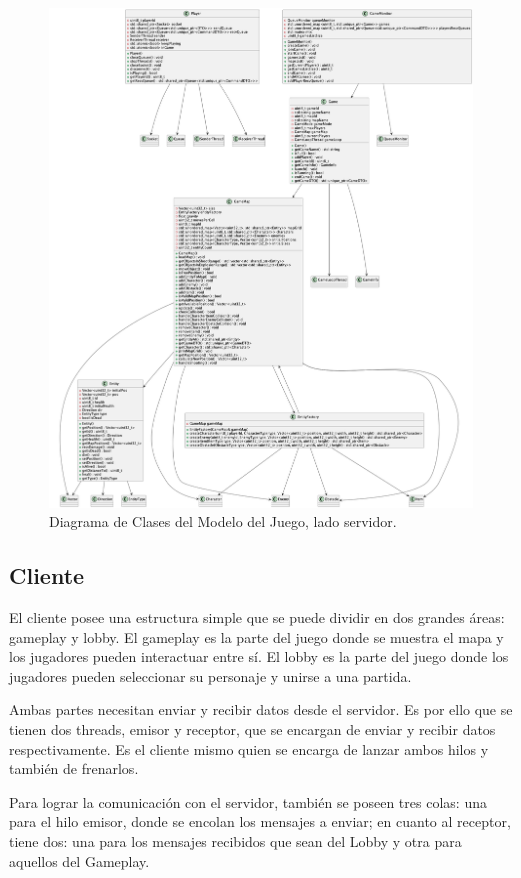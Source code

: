 \documentclass[titlepage,a4paper]{article}
\begin{document}
\begin{figure}[H]
  \centering
  \includegraphics[width=\textwidth]{images/Server Game Classes.png}
  \caption{Diagrama de Clases del Modelo del Juego, lado servidor.}
  \label{fig:server-game}
\end{figure}

\subsection{Cliente}
El cliente posee una estructura simple que se puede dividir en dos grandes áreas: gameplay y lobby. El gameplay es la parte del juego donde se muestra el mapa y los jugadores pueden interactuar entre sí. El lobby es la parte del juego donde los jugadores pueden seleccionar su personaje y unirse a una partida.

Ambas partes necesitan enviar y recibir datos desde el servidor. Es por ello que se tienen dos threads, emisor y receptor, que se encargan de enviar y recibir datos respectivamente. Es el cliente mismo quien se encarga de lanzar ambos hilos y también de frenarlos.

Para lograr la comunicación con el servidor, también se poseen tres colas: una para el hilo emisor, donde se encolan los mensajes a enviar; en cuanto al receptor, tiene dos: una para los mensajes recibidos que sean del Lobby y otra para aquellos del Gameplay. 
\end{document}

